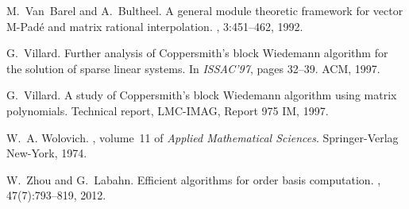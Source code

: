 \documentclass[12pt]{article}
\begin{document}
\begin{thebibliography}{10}
M.~Van~Barel and A.~Bultheel.
\newblock A general module theoretic framework for vector {M-Pad\'e} and matrix
  rational interpolation.
, 3:451--462, 1992.

G.~Villard.
\newblock Further analysis of {C}oppersmith's block {W}iedemann algorithm for
  the solution of sparse linear systems.
\newblock In {\em ISSAC'97}, pages 32--39. ACM, 1997.

G.~Villard.
\newblock A study of {C}oppersmith's block {W}iedemann algorithm using matrix
  polynomials.
\newblock Technical report, LMC-IMAG, Report 975 IM, 1997.

W.~A. Wolovich.
, volume~11 of {\em Applied
  Mathematical Sciences}.
\newblock Springer-Verlag New-York, 1974.

W.~Zhou and G.~Labahn.
\newblock Efficient algorithms for order basis computation.
, 47(7):793--819, 2012.

\end{thebibliography}
\end{document}
